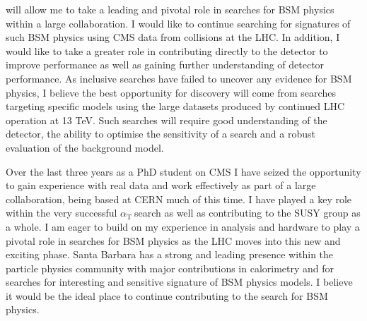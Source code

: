 \documentclass[11pt]{article}
\theoremstyle{plain} \numberwithin{equation}{section}
\theoremstyle{definition}
\DeclareRobustCommand{\alphat}{$\alpha_{\text{T}}~$}
\begin{document}
will allow me to take a leading and pivotal role in searches for BSM physics within a large collaboration.
I would like to continue searching for signatures of such BSM physics using CMS data from collisions at the LHC.
In addition, I would like to take a greater role in contributing directly to the detector to improve performance
as well as gaining further understanding of detector performance. As inclusive searches have failed 
to uncover any evidence for BSM physics, I believe the best opportunity for discovery will 
come from searches targeting specific models using the large datasets produced 
by continued LHC operation at 13 TeV. Such searches will require good understanding of the detector,
the ability to optimise the sensitivity of a search and a robust evaluation of the background model.

Over the last three years as a PhD student on CMS I have seized the opportunity to gain experience with real data
and work effectively as part of a large collaboration, being based at CERN much of this time. I have played 
a key role within the very successful \alphat search as well as contributing to the SUSY group as a whole.
I am eager to build on my experience in analysis and hardware to play a pivotal role in searches for BSM physics as the LHC
moves into this new and exciting phase. Santa Barbara has a strong and leading presence within the particle
physics community with major contributions in calorimetry and for searches for interesting and sensitive signature
of BSM physics models. I believe it would be the ideal place to continue contributing to the search for BSM physics.

\end{document}

